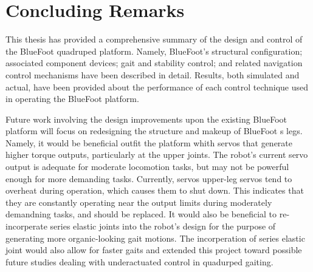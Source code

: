 \chapter{Concluding Remarks}

This thesis has provided a comprehensive summary of the design and control of the BlueFoot quadruped platform. Namely, BlueFoot's structural configuration; associated component devices; gait and stability control; and related navigation control mechanisms have been described in detail. Results, both simulated and actual, have been provided about the performance of each control technique used in operating the BlueFoot platform.

Future work involving the design improvements upon the existing BlueFoot platform will focus on redesigning the structure and makeup of BlueFoot
s legs. Namely, it would be beneficial outfit the platform whith servos that generate higher torque outputs, particularly at the upper joints. The robot's current servo output is adequate for moderate locomotion tasks, but may not be powerful enough for more demanding tasks. Currently, servos upper-leg servos tend to overheat during operation, which causes them to shut down. This indicates that they are constantly operating near the output limits during moderately demandning tasks, and should be replaced. It would also be beneficial to re-incorperate series elastic joints into the robot's design for the purpose of generating more organic-looking gait motions. The incorperation of series elastic joint would also allow for faster gaits and extended this project toward possible future studies dealing with underactuated control in quadurped gaiting.

